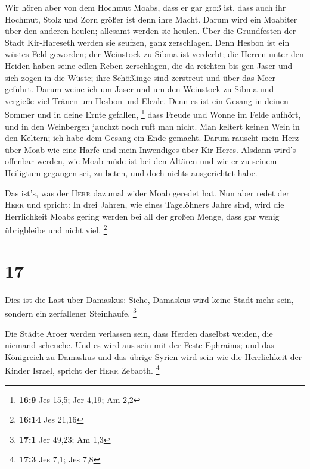  Wir hören aber von dem Hochmut Moabs, dass er gar groß
ist, dass auch ihr Hochmut, Stolz und Zorn größer ist denn ihre Macht.
 Darum wird ein Moabiter über den anderen heulen; allesamt
werden sie heulen. Über die Grundfesten der Stadt Kir-Hareseth werden
sie seufzen, ganz zerschlagen.  Denn Hesbon ist ein wüstes
Feld geworden; der Weinstock zu Sibma ist verderbt; die Herren unter den
Heiden haben seine edlen Reben zerschlagen, die da reichten bis gen
Jaser und sich zogen in die Wüste; ihre Schößlinge sind zerstreut und
über das Meer geführt.  Darum weine ich um Jaser und um
den Weinstock zu Sibma und vergieße viel Tränen um Hesbon und Eleale.
Denn es ist ein Gesang in deinen Sommer und in deine Ernte gefallen,
\footnote{\textbf{16:9} Jes 15,5; Jer 4,19; Am 2,2}  dass
Freude und Wonne im Felde aufhört, und in den Weinbergen jauchzt noch
ruft man nicht. Man keltert keinen Wein in den Keltern; ich habe dem
Gesang ein Ende gemacht.  Darum rauscht mein Herz über
Moab wie eine Harfe und mein Inwendiges über Kir-Heres. 
Alsdann wird's offenbar werden, wie Moab müde ist bei den Altären und
wie er zu seinem Heiligtum gegangen sei, zu beten, und doch nichts
ausgerichtet habe.

 Das ist's, was der \textsc{Herr} dazumal wider Moab
geredet hat.  Nun aber redet der \textsc{Herr} und
spricht: In drei Jahren, wie eines Tagelöhners Jahre sind, wird die
Herrlichkeit Moabs gering werden bei all der großen Menge, dass gar
wenig übrigbleibe und nicht viel. \footnote{\textbf{16:14} Jes 21,16}

\hypertarget{section-8}{%
\section{17}\label{section-8}}

 Dies ist die Last über Damaskus: Siehe, Damaskus wird
keine Stadt mehr sein, sondern ein zerfallener Steinhaufe. \footnote{\textbf{17:1}
  Jer 49,23; Am 1,3}

 Die Städte Aroer werden verlassen sein, dass Herden
daselbst weiden, die niemand scheuche.  Und es wird aus
sein mit der Feste Ephraims; und das Königreich zu Damaskus und das
übrige Syrien wird sein wie die Herrlichkeit der Kinder Israel, spricht
der \textsc{Herr} Zebaoth. \footnote{\textbf{17:3} Jes 7,1; Jes 7,8}

